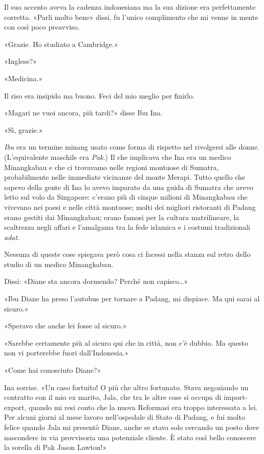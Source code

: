 Il suo accento aveva la cadenza indonesiana ma la sua dizione era
perfettamente corretta. «Parli molto bene» dissi, fu l'unico complimento
che mi venne in mente con così poco preavviso.

«Grazie. Ho studiato a Cambridge.»

«Inglese?»

«Medicina.»

Il riso era insipido ma buono. Feci del mio meglio per finirlo.

«Magari ne vuoi ancora, più tardi?» disse Ibu Ina.

«Sì, grazie.»

\emph{Ibu} era un termine minang usato come forma di rispetto nel
rivolgersi alle donne. (L'equivalente maschile era \emph{Pak}.) Il che
implicava che Ina era un medico Minangkabau e che ci trovavamo nelle
regioni montuose di Sumatra, probabilmente nelle immediate vicinanze del
monte Merapi. Tutto quello che sapevo della gente di Ina lo avevo
imparato da una guida di Sumatra che avevo letto sul volo da Singapore:
c'erano più di cinque milioni di Minangkabau che vivevano nei paesi e
nelle città montuose; molti dei migliori ristoranti di Padang erano
gestiti dai Minangkabau; erano famosi per la cultura matrilineare, la
scaltrezza negli affari e l'amalgama tra la fede islamica e i costumi
tradizionali \emph{adat}.

Nessuna di queste cose spiegava però cosa ci facessi nella stanza sul
retro dello studio di un medico Minangkabau.

Dissi: «Diane sta ancora dormendo? Perché non capisco\ldots»

«Ibu Diane ha preso l'autobus per tornare a Padang, mi dispiace. Ma qui
sarai al sicuro.»

«Speravo che anche lei fosse al sicuro.»

«Sarebbe certamente più al sicuro qui che in città, non c'è dubbio. Ma
questo non vi porterebbe fuori dall'Indonesia.»

«Come hai conosciuto Diane?»

Ina sorrise. «Un caso fortuito! O più che altro fortunato. Stava
negoziando un contratto con il mio ex marito, Jala, che tra le altre
cose si occupa di import-export, quando mi resi conto che la nuova
Reformasi era troppo interessata a lei. Per alcuni giorni al mese lavoro
nell'ospedale di Stato di Padang, e fui molto felice quando Jala mi
presentò Diane, anche se stava solo cercando un posto dove nascondere in
via provvisoria una potenziale cliente. È stato così bello conoscere la
sorella di Pak Jason Lawton!»

